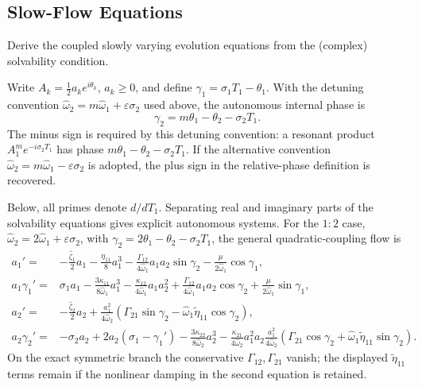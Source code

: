 \documentclass[11pt]{article}
\newenvironment{assignmentinstruction}{\par\begingroup\color{blue}}{\par\endgroup}
\begin{document}
\subsection{Slow-Flow Equations}
\begin{assignmentinstruction}
Derive the coupled slowly varying evolution equations from the (complex) solvability condition.
\end{assignmentinstruction}
Write $A_k=\tfrac12a_ke^{i\theta_k}$, $a_k\ge0$, and define $\gamma_1=\sigma_1T_1-\theta_1$. With the detuning convention $\hat{\omega}_2=m\hat{\omega}_1+\varepsilon\sigma_2$ used above, the autonomous internal phase is
\begin{equation}\label{eq:relative-phase}
\gamma_2=m\theta_1-\theta_2-\sigma_2T_1.
\end{equation}
The minus sign is required by this detuning convention: a resonant product $A_1^m e^{-i\sigma_2T_1}$ has phase $m\theta_1-\theta_2-\sigma_2T_1$. If the alternative convention $\hat{\omega}_2=m\hat{\omega}_1-\varepsilon\sigma_2$ is adopted, the plus sign in the relative-phase definition is recovered.

Below, all primes denote $d/dT_1$. Separating real and imaginary parts of the solvability equations gives explicit autonomous systems. For the $1{:}2$ case, $\hat{\omega}_2=2\hat{\omega}_1+\varepsilon\sigma_2$, with $\gamma_2=2\theta_1-\theta_2-\sigma_2T_1$, the general quadratic-coupling flow is
\begin{align}
a_1'={}&-\frac{\hat{\zeta}_1}{2}a_1-\frac{\eta_{11}}{8}a_1^3-\frac{\Gamma_{12}}{4\hat{\omega}_1}a_1a_2\sin\gamma_2-\frac{\mu}{2\hat{\omega}_1}\cos\gamma_1,\nonumber\\
a_1\gamma_1'={}&\sigma_1a_1-\frac{3\kappa_{11}}{8\hat{\omega}_1}a_1^3-\frac{\kappa_{12}}{4\hat{\omega}_1}a_1a_2^2+\frac{\Gamma_{12}}{4\hat{\omega}_1}a_1a_2\cos\gamma_2+\frac{\mu}{2\hat{\omega}_1}\sin\gamma_1,\nonumber\\
a_2'={}&-\frac{\hat{\zeta}_2}{2}a_2+\frac{a_1^2}{4\hat{\omega}_2}(\Gamma_{21}\sin\gamma_2-\hat{\omega}_1\tilde{\eta}_{11}\cos\gamma_2),\nonumber\\
a_2\gamma_2'={}&-\sigma_2a_2+2a_2(\sigma_1-\gamma_1')-\frac{3\kappa_{22}}{8\hat{\omega}_2}a_2^3-\frac{\kappa_{21}}{4\hat{\omega}_2}a_1^2a_2
\frac{a_1^2}{4\hat{\omega}_2}(\Gamma_{21}\cos\gamma_2+\hat{\omega}_1\tilde{\eta}_{11}\sin\gamma_2).\label{eq:slowflow-12}
\end{align}
On the exact symmetric branch the conservative $\Gamma_{12},\Gamma_{21}$ vanish; the displayed $\tilde{\eta}_{11}$ terms remain if the nonlinear damping in the second equation is retained.
\end{document}
